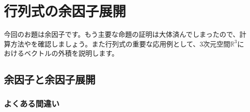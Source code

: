 \chapter{行列式の余因子展開}

今回のお題は余因子です。もう主要な命題の証明は大体済んでしまったので、計算方法やを確認しましょう。また行列式の重要な応用例として、$3$次元空間$\mathbb{R}^3$におけるベクトルの外積を説明します。

\section{余因子と余因子展開}

\subsection{よくある間違い}

